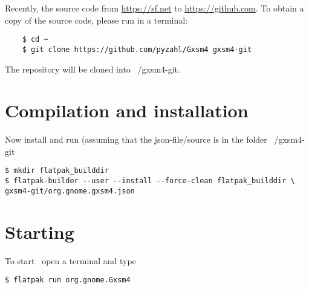 Recently, the source code from \url{https://sf.net} to \url{https://github.com}. To obtain a copy of the source code, please run in a terminal:

\begin{verbatim}
	$ cd ~
	$ git clone https://github.com/pyzahl/Gxsm4 gxsm4-git
\end{verbatim}

The repository will be cloned into ~/gxsm4-git.

\section{Compilation and installation}

Now install and run \Gxsm (assuming that the json-file/source is in the folder ~/gxsm4-git

\begin{verbatim}
$ mkdir flatpak_builddir
$ flatpak-builder --user --install --force-clean flatpak_builddir \ 
gxsm4-git/org.gnome.gxsm4.json
\end{verbatim}

\section{Starting \Gxsm}
To start \Gxsm\ open a terminal and type

\begin{verbatim}
$ flatpak run org.gnome.Gxsm4
\end{verbatim}



